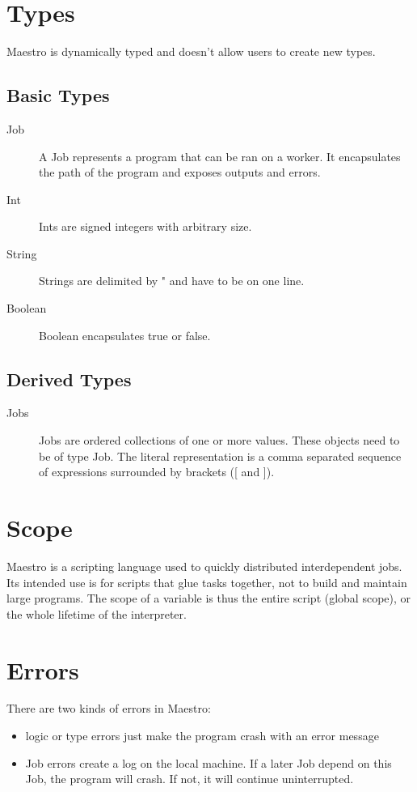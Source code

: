 \documentclass[12pt]{article}
\begin{document}
\section{Types}
Maestro is dynamically typed and doesn't allow users to create new types.
\subsection{Basic Types}
\begin{description}
  \item[Job] A Job represents a program that can be ran on a worker. It encapsulates
    the path of the program and exposes outputs and errors.
  \item[Int] Ints are signed integers with arbitrary size.
  \item[String] Strings are delimited by " and have to be on one line.
  \item[Boolean] Boolean encapsulates true or false.
\end{description}

\subsection{Derived Types}
\begin{description}
  \item[Jobs] Jobs are ordered collections of one or more values. These
    objects need to be of type Job. The literal representation is a
    comma separated sequence of expressions surrounded by brackets ([ and ]).
\end{description}

\section{Scope}
Maestro is a scripting language used to quickly distributed interdependent jobs.
Its intended use is for scripts that glue tasks together, not to build and
maintain large programs. The scope of a variable is thus the entire script
(global scope), or the whole lifetime of the interpreter.

\section{Errors}
There are two kinds of errors in Maestro:
\begin{itemize}
  \item logic or type errors just make the program crash with an error
  message
  \item Job errors create a log on the local machine. If a later Job depend
  on this Job, the program will crash. If not, it will continue uninterrupted.
\end{itemize}
\end{document}
